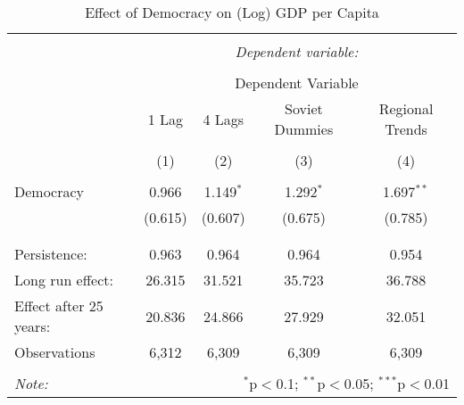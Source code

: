 
\begin{table}[!htbp] \centering 
  \caption{Effect of Democracy on (Log) GDP per Capita} 
  \label{} 
\begin{tabular}{@{\extracolsep{5pt}}lcccc} 
\\[-1.8ex]\hline 
\hline \\[-1.8ex] 
 & \multicolumn{4}{c}{\textit{Dependent variable:}} \\ 
\cline{2-5} 
\\[-1.8ex] & \multicolumn{4}{c}{Dependent Variable} \\ 
 & 1 Lag & 4 Lags & Soviet Dummies & Regional Trends \\ 
\\[-1.8ex] & (1) & (2) & (3) & (4)\\ 
\hline \\[-1.8ex] 
 Democracy & 0.966 & 1.149$^{*}$ & 1.292$^{*}$ & 1.697$^{**}$ \\ 
  & (0.615) & (0.607) & (0.675) & (0.785) \\ 
  & & & & \\ 
\hline \\[-1.8ex] 
Persistence:  & 0.963 & 0.964 & 0.964 & 0.954 \\ 
Long run effect:  & 26.315 & 31.521 & 35.723 & 36.788 \\ 
Effect after 25 years:  & 20.836 & 24.866 & 27.929 & 32.051 \\ 
Observations & 6,312 & 6,309 & 6,309 & 6,309 \\ 
\hline 
\hline \\[-1.8ex] 
\textit{Note:}  & \multicolumn{4}{r}{$^{*}$p$<$0.1; $^{**}$p$<$0.05; $^{***}$p$<$0.01} \\ 
\end{tabular} 
\end{table} 
